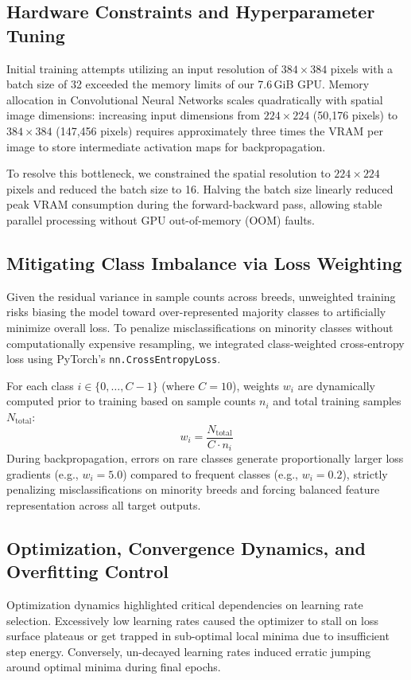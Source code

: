 \subsection{Hardware Constraints and Hyperparameter Tuning}
Initial training attempts utilizing an input resolution of $384 \times 384$ pixels with a batch size of 32 exceeded the memory limits of our 7.6\,GiB GPU. Memory allocation in Convolutional Neural Networks scales quadratically with spatial image dimensions: increasing input dimensions from $224 \times 224$ (50,176 pixels) to $384 \times 384$ (147,456 pixels) requires approximately three times the VRAM per image to store intermediate activation maps for backpropagation. 

To resolve this bottleneck, we constrained the spatial resolution to $224 \times 224$ pixels and reduced the batch size to 16. Halving the batch size linearly reduced peak VRAM consumption during the forward-backward pass, allowing stable parallel processing without GPU out-of-memory (OOM) faults.

\subsection{Mitigating Class Imbalance via Loss Weighting}
Given the residual variance in sample counts across breeds, unweighted training risks biasing the model toward over-represented majority classes to artificially minimize overall loss. To penalize misclassifications on minority classes without computationally expensive resampling, we integrated class-weighted cross-entropy loss using PyTorch's \texttt{nn.CrossEntropyLoss}.

For each class $i \in \{0, \dots, C-1\}$ (where $C=10$), weights $w_i$ are dynamically computed prior to training based on sample counts $n_i$ and total training samples $N_{\text{total}}$:
\begin{equation}
w_i = \frac{N_{\text{total}}}{C \cdot n_i}
\end{equation}
During backpropagation, errors on rare classes generate proportionally larger loss gradients (e.g., $w_i = 5.0$) compared to frequent classes (e.g., $w_i = 0.2$), strictly penalizing misclassifications on minority breeds and forcing balanced feature representation across all target outputs.

\subsection{Optimization, Convergence Dynamics, and Overfitting Control}
Optimization dynamics highlighted critical dependencies on learning rate selection. Excessively low learning rates caused the optimizer to stall on loss surface plateaus or get trapped in sub-optimal local minima due to insufficient step energy. Conversely, un-decayed learning rates induced erratic jumping around optimal minima during final epochs.

